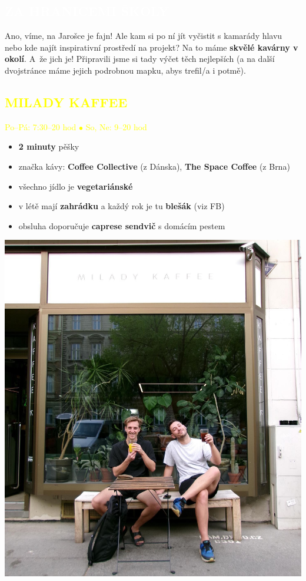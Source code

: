 \documentclass[a5paper, twoside]{article}
\newcommand{\nadpis}[4]{
  \vspace*{-50pt}
  \begin{tcolorbox}[colback = #2, boxrule = 0pt, grow to left by = #4,  grow to right by = #4, arc=8pt, height = 40pt]
    \vspace*{5pt}
    \centering \section*{\textcolor{#3}{#1}}
  \end{tcolorbox}
}
\newcommand{\podnadpis}[2]{
  \subsection*{\textcolor{#2}{#1}}
}
\begin{document}
\nadpis{ZA HRANICEMI ŠKOLY}{yellow}{white}{-2.75cm}

\enlargethispage{\pagegoal}
\noindent \small Ano, víme, na Jarošce je fajn! Ale kam si po ní jít vyčistit s kamarády hlavu nebo kde najít inspirativní prostředí na projekt? Na to máme \textbf{skvělé kavárny v okolí}. A~že jich je! Připravili jsme si tady výčet těch nejlepších (a na další dvojstránce máme jejich podrobnou mapku, abys trefil/a i potmě).\\

\noindent
\begin{minipage}{0.7\textwidth}
	\podnadpis{MILADY KAFFEE}{yellow}
	\textcolor{yellow}{Po--Pá: 7:30--20 hod $\bullet$ So, Ne: 9--20 hod}
	\vspace{5pt}
	\small
	\begin{itemize}[leftmargin=10pt]
		\item \textbf{2 minuty} pěšky
		\item značka kávy: \textbf{Coffee Collective} (z Dánska), \textbf{The Space Coffee} (z Brna)
		\item všechno jídlo je \textbf{vegetariánské}
		\item v létě mají \textbf{zahrádku} a každý rok je tu \textbf{blešák} (viz FB)
		\item obsluha doporučuje \textbf{caprese sendvič} s domácím pestem
	\end{itemize}
\end{minipage}
\hfill
\begin{minipage}{0.27\textwidth}
	\includegraphics[width=\linewidth]{milady_kaffee.jpg}
\end{minipage}
\\
\end{document}
